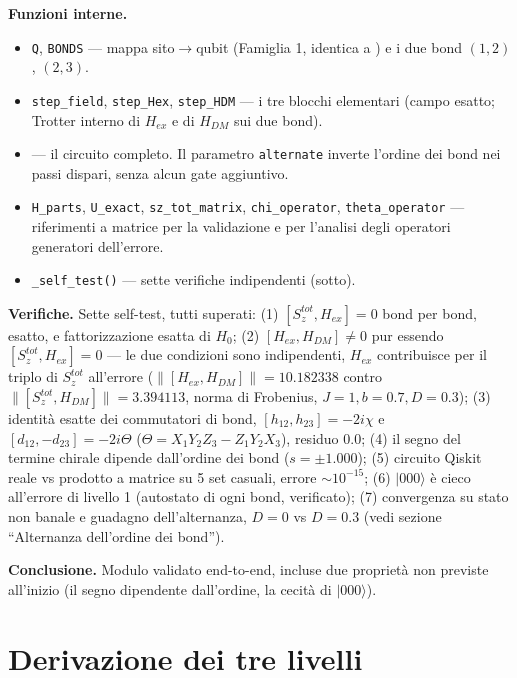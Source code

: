 \documentclass[11pt,a4paper]{article}
\newcommand{\ket}[1]{\lvert #1 \rangle}
\begin{document}
\textbf{Funzioni interne.}
\begin{itemize}
\item \texttt{Q}, \texttt{BONDS} — mappa sito$\to$qubit (Famiglia 1, identica a
\texttt{}) e i due bond $(1,2)$, $(2,3)$.
\item \texttt{step\_field}, \texttt{step\_Hex}, \texttt{step\_HDM} — i tre blocchi
elementari (campo esatto; Trotter interno di $H_{ex}$ e di $H_{DM}$ sui due bond).
\item \texttt{} — il
circuito completo. Il parametro \texttt{alternate} inverte l'ordine dei bond nei
passi dispari, senza alcun gate aggiuntivo.
\item \texttt{H\_parts}, \texttt{U\_exact}, \texttt{sz\_tot\_matrix},
\texttt{chi\_operator}, \texttt{theta\_operator} — riferimenti a matrice per la
validazione e per l'analisi degli operatori generatori dell'errore.
\item \texttt{\_self\_test()} — sette verifiche indipendenti (sotto).
\end{itemize}

\textbf{Verifiche.} Sette self-test, tutti superati:
(1) $[S_z^{tot},H_{ex}]=0$ bond per bond, esatto, e fattorizzazione esatta di
$H_0$; (2) $[H_{ex},H_{DM}]\neq0$ pur essendo $[S_z^{tot},H_{ex}]=0$ — le due
condizioni sono indipendenti, $H_{ex}$ contribuisce per il triplo di $S_z^{tot}$
all'errore ($\|[H_{ex},H_{DM}]\|{=}10.182338$ contro $\|[S_z^{tot},H_{DM}]\|{=}
3.394113$, norma di Frobenius, $J{=}1,b{=}0.7,D{=}0.3$); (3) identità esatte dei
commutatori di bond, $[h_{12},h_{23}]=-2i\chi$ e $[d_{12},-d_{23}]=-2i\Theta$
($\Theta=X_1Y_2Z_3-Z_1Y_2X_3$), residuo $0.0$; (4) il segno del termine chirale
dipende dall'ordine dei bond ($s=\pm1.000$); (5) circuito Qiskit reale vs prodotto
a matrice su 5 set casuali, errore $\sim10^{-15}$; (6) $\ket{000}$ è cieco
all'errore di livello 1 (autostato di ogni bond, verificato); (7) convergenza su
stato non banale e guadagno dell'alternanza, $D{=}0$ vs $D{=}0.3$ (vedi
sezione ``Alternanza dell'ordine dei bond'').

\textbf{Conclusione.} Modulo validato end-to-end, incluse due proprietà non
previste all'inizio (il segno dipendente dall'ordine, la cecità di $\ket{000}$).

\section*{Derivazione dei tre livelli}
\end{document}

